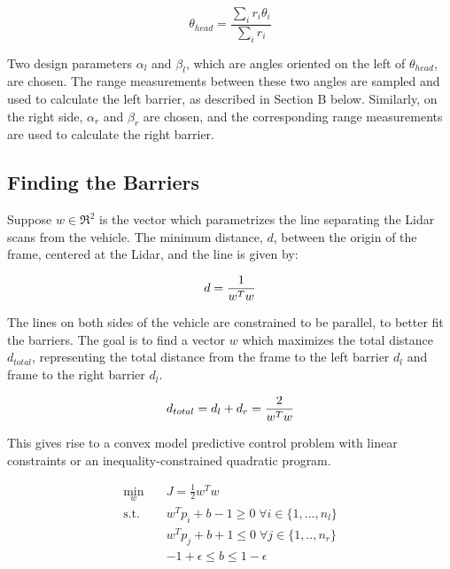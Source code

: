 \documentclass[conference]{IEEEtran}
\begin{document}
\[\theta_{head} = \frac{\sum_{i} r_i \theta_i}{\sum_{i} r_i} \]

Two design parameters $\alpha_l$ and $\beta_l$, which are angles oriented on the left of $\theta_{head}$, are chosen.  The range measurements between these two angles are sampled and used to calculate the left barrier, as described in Section B below. Similarly, on the right side, $\alpha_r$ and $\beta_r$ are chosen, and the corresponding range measurements are used to calculate the right barrier. 


\subsection{Finding the Barriers}
Suppose $w \in \Re^2$  is the vector which parametrizes the line separating the Lidar scans from the vehicle. The minimum distance, $d$, between the origin of the frame, centered at the Lidar, and the line is given by:

\begin{align}
    d = \frac{1}{w^T w} \notag
\end{align}

The lines on both sides of the vehicle are constrained to be parallel, to better fit the barriers. The goal is to find a vector $w$ which maximizes the total distance $d_{total}$, representing the total distance from the frame to the left barrier $d_l$ and frame to the right barrier $d_l$. 

\begin{align}
    d_{total} = d_l + d_r = \frac{2}{w^T w} \notag
\end{align}


This gives rise to a convex model predictive control problem with linear constraints or an inequality-constrained quadratic program.  

\begin{equation}
\begin{aligned}
        \min_{w}  \quad & J = \frac{1}{2}w^T w \\
        \text{s.t.} \quad & w^Tp_i + b - 1 \geq 0  \; \forall i \in \{1,...,n_l\} \\
        & w^Tp_j + b + 1 \leq 0 \; \forall j \in \{1,..,n_r\}\\ 
        & -1+\epsilon \leq b \leq 1 - \epsilon
\end{aligned}
\end{equation}
\end{document}
